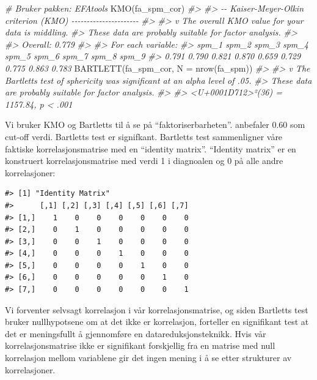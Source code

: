 \documentclass[
]{article}
\newenvironment{Shaded}{\begin{snugshade}}{\end{snugshade}}
\newcommand{\AttributeTok}[1]{\textcolor[rgb]{0.77,0.63,0.00}{#1}}
\newcommand{\CommentTok}[1]{\textcolor[rgb]{0.56,0.35,0.01}{\textit{#1}}}
\newcommand{\FunctionTok}[1]{\textcolor[rgb]{0.00,0.00,0.00}{#1}}
\newcommand{\NormalTok}[1]{#1}
\begin{document}
\begin{Shaded}
\begin{Highlighting}[]
\CommentTok{\# Bruker pakken: EFAtools}
\FunctionTok{KMO}\NormalTok{(fa\_spm\_cor)}
\CommentTok{\#\textgreater{} }
\CommentTok{\#\textgreater{} {-}{-} Kaiser{-}Meyer{-}Olkin criterion (KMO) {-}{-}{-}{-}{-}{-}{-}{-}{-}{-}{-}{-}{-}{-}{-}{-}{-}{-}{-}{-}{-}{-}}
\CommentTok{\#\textgreater{} }
\CommentTok{\#\textgreater{} v The overall KMO value for your data is middling.}
\CommentTok{\#\textgreater{}   These data are probably suitable for factor analysis.}
\CommentTok{\#\textgreater{} }
\CommentTok{\#\textgreater{}   Overall: 0.779}
\CommentTok{\#\textgreater{} }
\CommentTok{\#\textgreater{}   For each variable:}
\CommentTok{\#\textgreater{} spm\_1 spm\_2 spm\_3 spm\_4 spm\_5 spm\_6 spm\_7 spm\_8 spm\_9 }
\CommentTok{\#\textgreater{} 0.791 0.790 0.821 0.870 0.659 0.729 0.775 0.863 0.783}
\FunctionTok{BARTLETT}\NormalTok{(fa\_spm\_cor, }\AttributeTok{N =} \FunctionTok{nrow}\NormalTok{(fa\_spm))}
\CommentTok{\#\textgreater{} }
\CommentTok{\#\textgreater{} v The Bartlett\textquotesingle{}s test of sphericity was significant at an alpha level of .05.}
\CommentTok{\#\textgreater{}   These data are probably suitable for factor analysis.}
\CommentTok{\#\textgreater{} }
\CommentTok{\#\textgreater{}   \textless{}U+0001D712\textgreater{}²(36) = 1157.84, p \textless{} .001}
\end{Highlighting}
\end{Shaded}

Vi bruker KMO og Bartletts til å se på ``faktoriserbarheten''. \citet{kaiserIndexFactorialSimplicity1974} anbefaler 0.60 som cut-off verdi. Bartletts test er signifkant. Bartletts test sammenligner våre faktiske korrelasjonsmatrise med en ``identity matrix''. ``Identity matrix'' er en konstruert korrelasjonsmatrise med verdi 1 i diagnoalen og 0 på alle andre korrelasjoner:

\begin{verbatim}
#> [1] "Identity Matrix"
#>      [,1] [,2] [,3] [,4] [,5] [,6] [,7]
#> [1,]    1    0    0    0    0    0    0
#> [2,]    0    1    0    0    0    0    0
#> [3,]    0    0    1    0    0    0    0
#> [4,]    0    0    0    1    0    0    0
#> [5,]    0    0    0    0    1    0    0
#> [6,]    0    0    0    0    0    1    0
#> [7,]    0    0    0    0    0    0    1
\end{verbatim}

Vi forventer selvsagt korrelasjon i vår korrelasjonsmatrise, og siden Bartletts test bruker nullhypotsene om at det ikke er korrelasjon, forteller en signifikant test at det er meningsfullt å gjennomføre en datareduksjonsteknikk. Hvis vår korrelasjonsmatrise ikke er signifikant forskjellig fra en matrise med null korrelasjon mellom variablene gir det ingen mening i å se etter strukturer av korrelasjoner.
\end{document}
